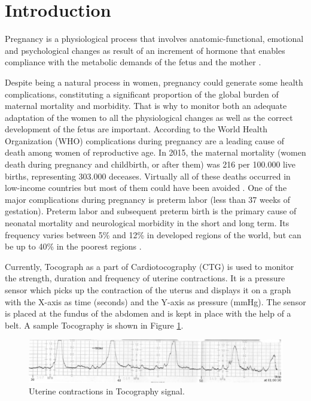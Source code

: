 \documentclass[bioengineering,article,submit,moreauthors,pdftex,10pt,a4paper]{mdpi}
\begin{document}
\section{Introduction}

Pregnancy is a physiological process that involves
anatomic-functional, emotional and psychological changes as
result of an increment of hormone that enables compliance
with the metabolic demands of the fetus and the mother \cite{ref-weisswolfe}.

Despite being a natural process in women, pregnancy could
generate some health complications, constituting a significant
proportion of the global burden of maternal mortality and
morbidity. That is why to monitor both an adequate
adaptation of the women to all the physiological changes as
well as the correct development of the fetus are important.
According to the World Health Organization (WHO)
complications during pregnancy are a leading cause of death
among women of reproductive age. In 2015, the maternal mortality (women death during pregnancy and childbirth, or after them) was 216 per 100.000 live births, representing 303.000 deceases. Virtually
all of these deaths occurred in low-income countries but most
of them could have been avoided \cite{ref-alkema}. One of the major
complications during pregnancy is preterm labor (less than 37
weeks of gestation). Preterm labor and subsequent preterm
birth is the primary cause of neonatal mortality and
neurological morbidity in the short and long term. Its
frequency varies between 5\% and 12\% in developed regions
of the world, but can be up to 40\% in the poorest regions \cite{ref-villa}. 


Currently, Tocograph as a part of Cardiotocography (CTG) is
used to monitor the strength, duration and frequency of uterine
contractions. It is a pressure sensor which picks up the
contraction of the uterus and displays it on a graph with the X-axis as time (seconds) and the Y-axis as pressure (mmHg).
The sensor is placed at the fundus of the abdomen and is kept
in place with the help of a belt. A sample Tocography is
shown in Figure \ref{toco}.

 \begin{figure}[H]
 	\caption{\label{toco} Uterine contractions in Tocography signal.}
 	\begin{center}
 		\includegraphics[scale=0.45]{imagens/toco.jpg} 		
 	\end{center}
 \end{figure}
 
\end{document}
